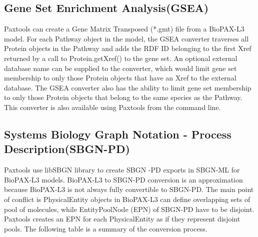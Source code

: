 \documentclass{tufte-book}
\begin{document}
\subsection{Gene Set Enrichment Analysis(GSEA)}
Paxtools  can create a Gene Matrix Transposed (*.gmt) file from a BioPAX-L3 model.  For each Pathway object in the model, the GSEA converter traverses all Protein objects in the Pathway and adds the RDF ID belonging to the first Xref returned by a call to Protein.getXref() to the gene set.  An optional external database name can be supplied to the converter, which would limit gene set membership to only those Protein objects that have an Xref to the external database.  The GSEA converter also has the ability to limit gene set membership to only those Protein objects that belong to the same species as the Pathway.  This converter is also available using Paxtools from the command line.

\subsection{Systems Biology Graph Notation - Process Description(SBGN-PD)}
Paxtools use libSBGN library to create SBGN -PD exports in SBGN-ML for BioPAX-L3 models. BioPAX-L3 to SBGN-PD conversion is an approximation because BioPAX-L3 is not always fully convertible to SBGN-PD. The main point of conflict is PhysicalEntity objects in BioPAX-L3 can define overlapping sets of pool of molecules, while EntityPoolNode (EPN) of SBGN-PD have to be disjoint. Paxtools creates an EPN for each PhysicalEntity as if they represent disjoint pools.
The following table is a summary of the conversion process.
\end{document}
